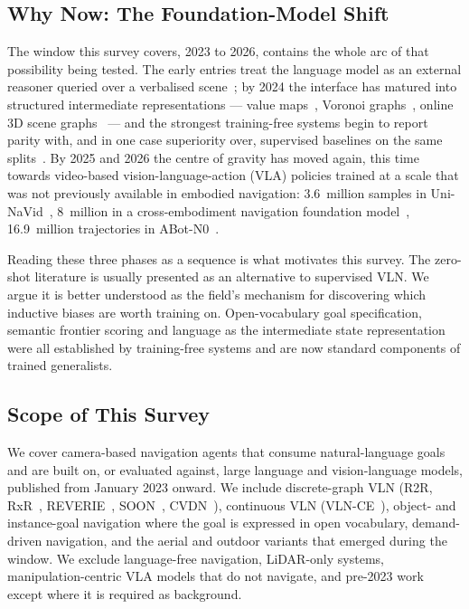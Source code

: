 \documentclass[journal]{IEEEtran}
\begin{document}
\subsection{Why Now: The Foundation-Model Shift}
The window this survey covers, 2023 to 2026, contains the whole arc of that
possibility being tested. The early entries treat the language model as an
external reasoner queried over a verbalised
scene~\cite{zhou2024navgpta,dorbala2022clip}; by 2024 the interface has
matured into structured intermediate representations --- value
maps~\cite{yokoyama2024vlfm}, Voronoi
graphs~\cite{wu2024voronav}, online 3D scene
graphs~\cite{yin2024online,werby2024hierarchical} --- and the strongest
training-free systems begin to report parity with, and in one case
superiority over, supervised baselines on the same
splits~\cite{yin2024online}. By 2025 and 2026 the centre of gravity has
moved again, this time towards video-based vision-language-action (VLA)
policies trained at a scale that was not previously available in
embodied navigation: 3.6~million samples in
Uni-NaVid~\cite{zhang2024navidb}, 8~million in a cross-embodiment
navigation foundation model~\cite{zhang2025embodied}, 16.9~million
trajectories in ABot-N0~\cite{chu2026abot}.

Reading these three phases as a sequence is what motivates this survey. The
zero-shot literature is usually presented as an alternative to supervised
VLN. We argue it is better understood as the field's mechanism for
discovering which inductive biases are worth training on. Open-vocabulary
goal specification, semantic frontier scoring and language as the
intermediate state representation were all established by training-free
systems and are now standard components of trained generalists.

\subsection{Scope of This Survey}
We cover camera-based navigation agents that consume natural-language goals
and are built on, or evaluated against, large language and vision-language
models, published from January 2023 onward. We include discrete-graph VLN
(R2R, RxR~\cite{ku2020room}, REVERIE~\cite{qi2020reverie},
SOON~\cite{zhu2021soon}, CVDN~\cite{thomason2019vision}), continuous VLN
(VLN-CE~\cite{krantz2020beyond}), object- and instance-goal navigation
where the goal is expressed in open vocabulary, demand-driven navigation,
and the aerial and outdoor variants that emerged during the window. We
exclude language-free navigation, LiDAR-only systems, manipulation-centric
VLA models that do not navigate, and pre-2023 work except where it is
required as background.
\end{document}
